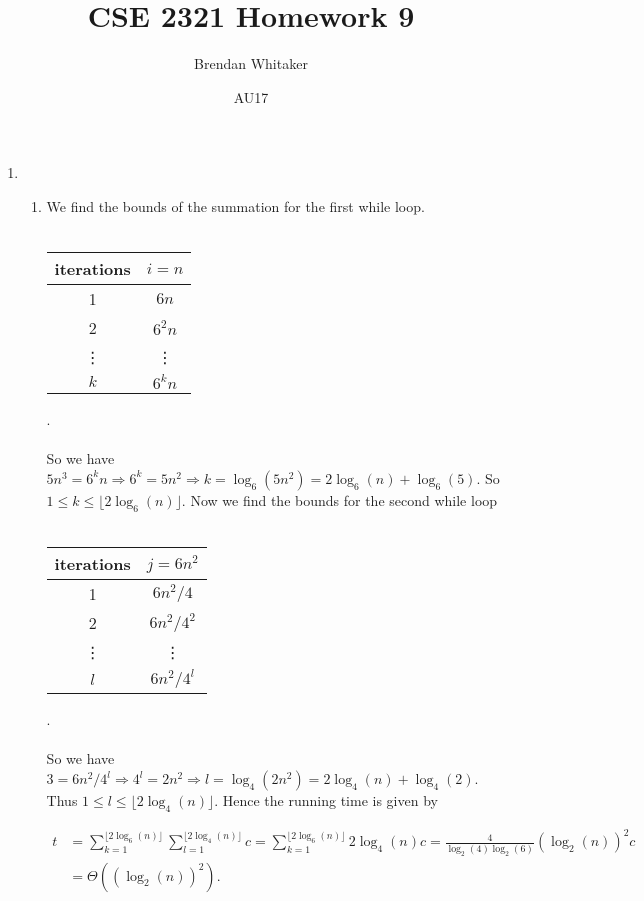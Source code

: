 \documentclass[10pt,oneside,reqno]{amsart}
\theoremstyle{plain}
\theoremstyle{definition}
\begin{document}
\title{CSE 2321 Homework 9}

\date{AU17}

\author[Brendan Whitaker]{Brendan Whitaker}

\maketitle

\begin{enumerate}[label=\arabic*.]

\item 

\begin{enumerate}

\item 
We find the bounds of the summation for the first while loop. \\\\
\begin{tabular}{c|c}
iterations & $i = n$\\
\hline
1 & $6n$\\
2 & $6^2n$\\
\vdots & \vdots\\
$k$ & $6^kn$
\end{tabular}.\\\\
So we have $5n^3 = 6^kn \Rightarrow 6^k = 5n^2 \Rightarrow k = \log_6(5n^2)  = \boxed{2\log_6(n)} + \log_6(5)$. So $1 \leq k \leq \lfloor 2\log_6(n) \rfloor$. Now we find the bounds for the second while loop\\\\
\begin{tabular}{c|c}
iterations & $j = 6n^2$\\
\hline
1 & $6n^2/4$\\
2 & $6n^2/4^2$\\
\vdots & \vdots\\
$l$ & $6n^2/4^l$
\end{tabular}.\\\\
So we have $3 = 6n^2/4^l \Rightarrow 4^l = 2n^2 \Rightarrow l = \log_4(2n^2) = \boxed{2\log_4(n)} + \log_4(2)$. Thus $1 \leq l \leq \lfloor 2\log_4(n)\rfloor$. Hence the running time is given by



\begin{equation}
\begin{aligned}
t &= \sum_{k = 1}^{\lfloor 2\log_6(n)\rfloor} \sum_{l = 1}^{\lfloor 2\log_4(n)\rfloor} c = \sum_{k = 1}^{\lfloor 2\log_6(n)\rfloor} 2\log_4(n)c = \frac{4}{\log_2(4)\log_2(6)}(\log_2(n))^2c \\
&= \boxed{\Theta((\log_2(n))^2).} 
\end{aligned}
\end{equation}


\end{enumerate}
\end{enumerate}
\end{document}
